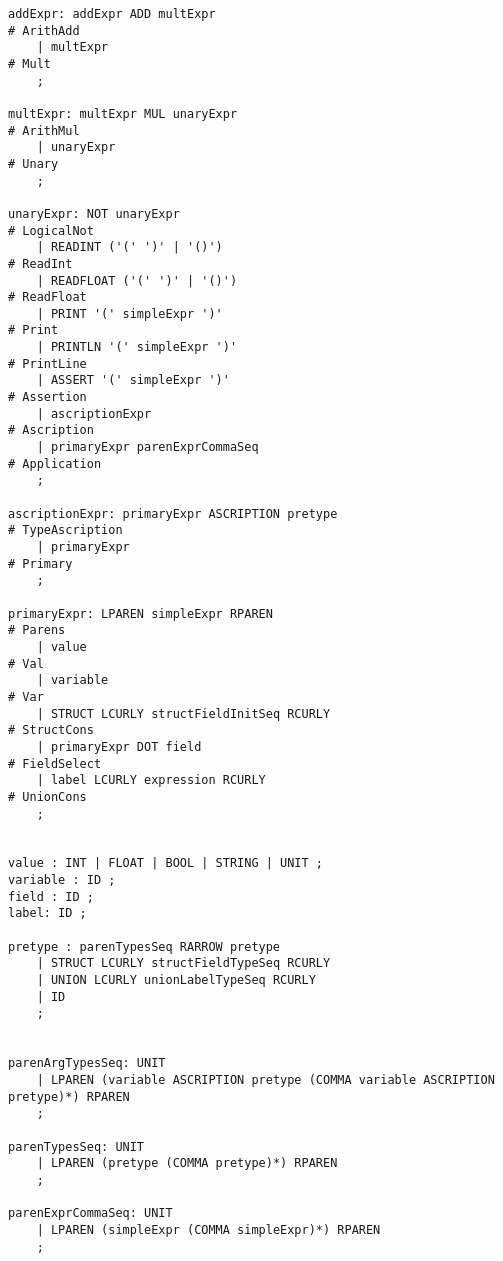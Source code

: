\begin{lstlisting}
addExpr: addExpr ADD multExpr                                             # ArithAdd
    | multExpr                                                            # Mult
    ;

multExpr: multExpr MUL unaryExpr                                          # ArithMul
    | unaryExpr                                                           # Unary
    ;

unaryExpr: NOT unaryExpr                                                  # LogicalNot
    | READINT ('(' ')' | '()')                                            # ReadInt
    | READFLOAT ('(' ')' | '()')                                          # ReadFloat
    | PRINT '(' simpleExpr ')'                                            # Print
    | PRINTLN '(' simpleExpr ')'                                          # PrintLine
    | ASSERT '(' simpleExpr ')'                                           # Assertion
    | ascriptionExpr                                                      # Ascription
    | primaryExpr parenExprCommaSeq                                       # Application
    ;

ascriptionExpr: primaryExpr ASCRIPTION pretype                            # TypeAscription
    | primaryExpr                                                         # Primary
    ;

primaryExpr: LPAREN simpleExpr RPAREN                                     # Parens
    | value                                                               # Val
    | variable                                                            # Var
    | STRUCT LCURLY structFieldInitSeq RCURLY                             # StructCons
    | primaryExpr DOT field                                               # FieldSelect
    | label LCURLY expression RCURLY                                      # UnionCons
    ;


value : INT | FLOAT | BOOL | STRING | UNIT ;
variable : ID ;
field : ID ;
label: ID ;

pretype : parenTypesSeq RARROW pretype
    | STRUCT LCURLY structFieldTypeSeq RCURLY
    | UNION LCURLY unionLabelTypeSeq RCURLY
    | ID
    ;


parenArgTypesSeq: UNIT
    | LPAREN (variable ASCRIPTION pretype (COMMA variable ASCRIPTION pretype)*) RPAREN
    ;

parenTypesSeq: UNIT
    | LPAREN (pretype (COMMA pretype)*) RPAREN
    ;

parenExprCommaSeq: UNIT
    | LPAREN (simpleExpr (COMMA simpleExpr)*) RPAREN
    ;


\end{lstlisting}
